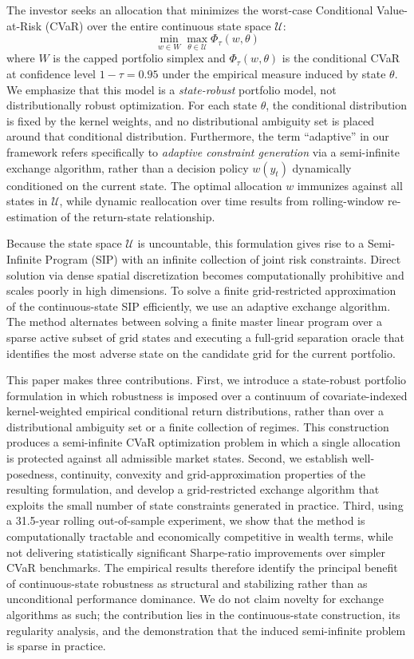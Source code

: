 \documentclass[smallcondensed]{svjour3}
\begin{document}
The investor seeks an allocation that minimizes the worst-case Conditional Value-at-Risk (CVaR) over the entire continuous state space $\mathcal{U}$:
\begin{equation}
    \min_{w \in W} \max_{\theta \in \mathcal{U}} \Phi_\tau(w, \theta)
\end{equation}
where $W$ is the capped portfolio simplex and $\Phi_\tau(w, \theta)$ is the conditional CVaR at confidence level $1-\tau = 0.95$ under the empirical measure induced by state $\theta$. We emphasize that this model is a \emph{state-robust} portfolio model, not distributionally robust optimization. For each state $\theta$, the conditional distribution is fixed by the kernel weights, and no distributional ambiguity set is placed around that conditional distribution. Furthermore, the term ``adaptive'' in our framework refers specifically to \emph{adaptive constraint generation} via a semi-infinite exchange algorithm, rather than a decision policy $w(y_t)$ dynamically conditioned on the current state. The optimal allocation $w$ immunizes against all states in $\mathcal{U}$, while dynamic reallocation over time results from rolling-window re-estimation of the return-state relationship.

Because the state space $\mathcal{U}$ is uncountable, this formulation gives rise to a Semi-Infinite Program (SIP) with an infinite collection of joint risk constraints. Direct solution via dense spatial discretization becomes computationally prohibitive and scales poorly in high dimensions. To solve a finite grid-restricted approximation of the continuous-state SIP efficiently, we use an adaptive exchange algorithm. The method alternates between solving a finite master linear program over a sparse active subset of grid states and executing a full-grid separation oracle that identifies the most adverse state on the candidate grid for the current portfolio.

This paper makes three contributions. First, we introduce a state-robust portfolio formulation in which robustness is imposed over a continuum of covariate-indexed kernel-weighted empirical conditional return distributions, rather than over a distributional ambiguity set or a finite collection of regimes. This construction produces a semi-infinite CVaR optimization problem in which a single allocation is protected against all admissible market states. Second, we establish well-posedness, continuity, convexity and grid-approximation properties of the resulting formulation, and develop a grid-restricted exchange algorithm that exploits the small number of state constraints generated in practice. Third, using a 31.5-year rolling out-of-sample experiment, we show that the method is computationally tractable and economically competitive in wealth terms, while not delivering statistically significant Sharpe-ratio improvements over simpler CVaR benchmarks. The empirical results therefore identify the principal benefit of continuous-state robustness as structural and stabilizing rather than as unconditional performance dominance. We do not claim novelty for exchange algorithms as such; the contribution lies in the continuous-state construction, its regularity analysis, and the demonstration that the induced semi-infinite problem is sparse in practice.
\end{document}
